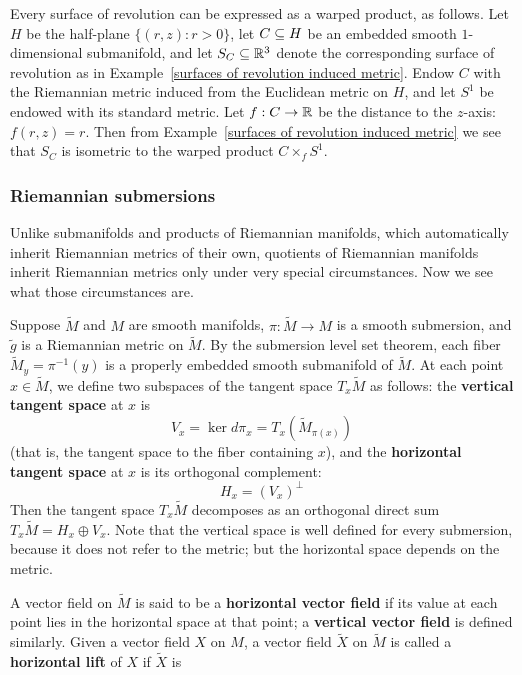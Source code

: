 \begin{example}
Every surface of revolution can be expressed as a warped product, as follows. Let 
$H$ be the half-plane $\{(r,z):r>0\}$, let $C\subseteq H$ be an embedded smooth $1$-dimensional submanifold, 
and let $S_C\subseteq\mathbb{R}^3$ denote the corresponding surface of revolution as in 
Example~\ref{surfaces of revolution induced metric}. Endow $C$ with the Riemannian metric induced from 
the Euclidean metric on $H$, and let $S^1$ be endowed with its standard metric. Let $f:C\to\mathbb{R}$ be the 
distance to the $z$-axis: $f(r,z)=r$. Then from Example~\ref{surfaces of revolution induced metric} we 
see that $S_C$ is isometric to the warped product $C\times_f S^1$.
\end{example}
\subsubsection{Riemannian submersions}
Unlike submanifolds and products of Riemannian manifolds, which automatically inherit 
Riemannian metrics of their own, quotients of Riemannian manifolds inherit Riemannian 
metrics only under very special circumstances. Now we see what those circumstances 
are.\par
Suppose $\widetilde{M}$ and $M$ are smooth manifolds, $\pi:\widetilde{M}\to M$ is a 
smooth submersion, and $\widetilde{g}$ is a Riemannian metric on $\widetilde{M}$. By 
the submersion level set theorem, each fiber $\widetilde{M}_y=\pi^{-1}(y)$ is a properly 
embedded smooth submanifold of $\widetilde{M}$. At each point $x\in\widetilde{M}$, we 
define two subspaces of the tangent space $T_x\widetilde{M}$ as follows: the 
\textbf{vertical tangent space} at $x$ is
\[V_x=\ker d\pi_x=T_x(\widetilde{M}_{\pi(x)})\]
(that is, the tangent space to the fiber containing $x$), and the \textbf{horizontal tangent 
space} at $x$ is its orthogonal complement:
\[H_x=(V_x)^\bot\]
Then the tangent space $T_x\widetilde{M}$ decomposes as an orthogonal direct sum 
$T_x\widetilde{M}=H_x\oplus V_x$. Note that the vertical space is well defined for 
every submersion, because it does not refer to the metric; but the horizontal 
space depends on the metric.\par
A vector field on $\widetilde{M}$ is said to be a \textbf{horizontal vector field} if its 
value at each point lies in the horizontal space at that point; a \textbf{vertical vector 
field} is defined similarly. Given a vector field $X$ on $M$, a vector field $\widetilde{X}$ 
on $\widetilde{M}$ is called a \textbf{horizontal lift} of $X$ if $\widetilde{X}$ is 

